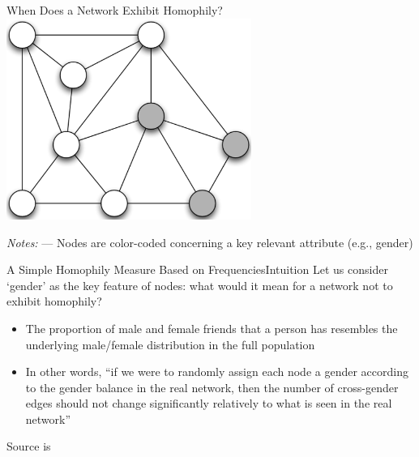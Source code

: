\documentclass[notes, aspectratio=1610]{beamer}
\begin{document}
\begin{frame}{When Does a Network Exhibit Homophily?}{}
	\centering 
	\includegraphics[width=0.6\textwidth]{images/fig_4_2.png}

	\footnotesize
	\textit{Notes:} --- Nodes are color-coded concerning a key 
	relevant attribute (e.g., gender)
\end{frame}

%
%
%
%			
%

\begin{frame}{A Simple Homophily Measure Based on Frequencies}{Intuition}
	Let us consider `gender' as the key feature of nodes: what would 
	it mean for a network not to exhibit homophily?
	\begin{itemize}
		\item 
		The proportion of male and female friends that a person has 
		resembles the underlying male/female distribution in the full 
		population
		\pause 
		\item 
		In other words, ``if we were to randomly assign each node a 
		gender according to the gender balance in the real network, then 
		the number of cross-gender edges should not change 
		significantly relatively to what is seen in the real network''
	\end{itemize}

Source is 
\end{frame}
\end{document}
